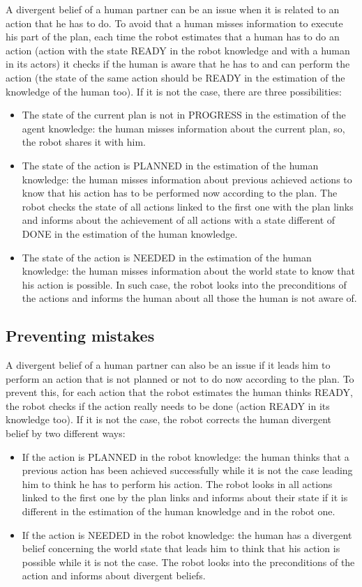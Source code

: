 \documentclass[english,a4paper,11pt,twoside]{StyleThese}
\begin{document}
A divergent belief of a human partner can be an issue when it is related to an action that he has to do. To avoid that a human misses information to execute his part of the plan, each time the robot estimates that a human has to do an action (action with the state READY in the robot knowledge and with a human in its actors) it checks if the human is aware that he has to and can perform the action (the state of the same action should be READY in the estimation of the knowledge of the human too). If it is not the case, there are three possibilities:
\begin{itemize}
\item The state of the current plan is not in PROGRESS in the estimation of the agent knowledge: the human misses information about the current plan, so, the robot shares it with him.
\item The state of the action is PLANNED in the estimation of the human knowledge: the human misses information about previous achieved actions to know that his action has to be performed now according to the plan. The robot checks the state of all actions linked to the first one with the plan links and informs about the achievement of all actions with a state different of DONE in the estimation of the human knowledge.
\item The state of the action is NEEDED in the estimation of the human knowledge: the human misses information about the world state to know that his action is possible. In such case, the robot looks into the preconditions of the actions and informs the human about all those the human is not aware of.
\end{itemize}

\subsection{Preventing mistakes}

A divergent belief of a human partner can also be an issue if it leads him to perform an action that is not planned or not to do now according to the plan. To prevent this, for each action that the robot estimates the human thinks READY, the robot checks if the action really needs to be done (action READY in its knowledge too). If it is not the case, the robot corrects the human divergent belief by two different ways:
\begin{itemize}
\item If the action is PLANNED in the robot knowledge: the human thinks that a previous action has been achieved successfully while it is not the case leading him to think he has to perform his action. The robot looks in all actions linked to the first one by the plan links and informs about their state if it is different in the estimation of the human knowledge and in the robot one.
\item If the action is NEEDED in the robot knowledge: the human has a divergent belief concerning the world state that leads him to think that his action is possible while it is not the case. The robot looks into the preconditions of the action and informs about divergent beliefs.
\end{itemize}
\end{document}
